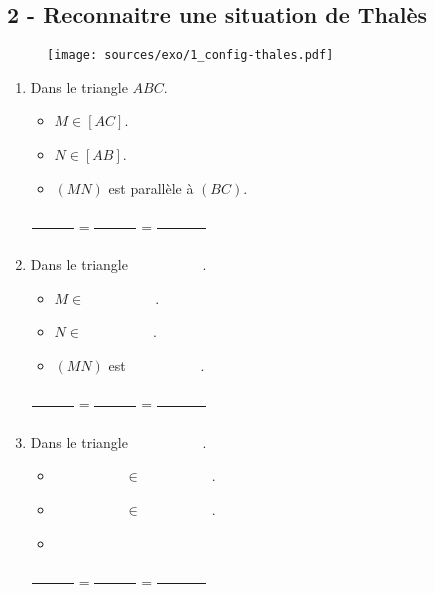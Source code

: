 \documentclass[11pt]{article}
\begin{document}

\setlength{\columnseprule}{1pt}

\subsection*{2 - Reconnaitre une situation de Thalès}

\begin{figure}[H]
  \centering
  \texttt{[image: sources/exo/1\_config-thales.pdf]}
\end{figure}

\begin{multicols}{3}
\begin{enumerate}
\item Dans le triangle $ABC$.

  \begin{itemize}
  \item $M \in [AC]$.
  \item $N \in [AB]$.
  \item $(MN)$ est parallèle à $(BC)$.
  \end{itemize}
  
  $\dfrac{\phantom{123456}}{\phantom{123456}} = \dfrac{\phantom{123456}}{\phantom{123456}} = \dfrac{\phantom{1234567}}{\phantom{123456}} $

\item Dans le triangle $\phantom{1234567890}$.
  \begin{itemize}
  \item $M \in \phantom{1234567890}$.
  \item $N \in \phantom{1234567890}$.
  \item $(MN)$ est $\phantom{1234567890}$.
  \end{itemize}

  $\dfrac{\phantom{123456}}{\phantom{123456}} = \dfrac{\phantom{123456}}{\phantom{123456}} = \dfrac{\phantom{1234567}}{\phantom{123456}} $

\item Dans le triangle $\phantom{1234567890}$.
  \begin{itemize}   
  \item $\phantom{1234567890} \in \phantom{1234567890}$.
  \item $\phantom{1234567890} \in \phantom{1234567890}$.
  \item \phantom{123456}
  \end{itemize}

  $\dfrac{\phantom{123456}}{\phantom{123456}} = \dfrac{\phantom{123456}}{\phantom{123456}} = \dfrac{\phantom{1234567}}{\phantom{123456}} $ 
\end{enumerate}
\end{multicols}
\end{document}
